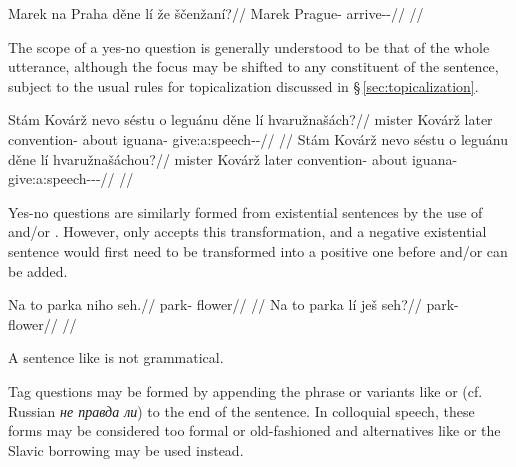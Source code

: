 \pex
\begingl
  \gla Marek na Praha děne lí že ščenžaní?//
  \glb Marek \Loc{} Prague-\Acc{} \Spec{} \Q{} \Pfv{} arrive-\Av{}-\Ret{}//
  \glft {}//
\endgl
\xe

The scope of a yes-no question is generally understood to be that of the whole
utterance, although the focus may be shifted to any constituent of the sentence,
subject to the usual rules for topicalization discussed in
\S\,\ref{sec:topicalization}.

\pex
\a\begingl
  \gla Stám Kovárž nevo séstu o leguánu děne lí hvaružnašách?//
  \glb mister Kovárž later convention-\Ins{} about iguana-\Ins{} \Spec{} \Q{} give:a:speech-\Av{}-\Ctp{}//
  \glft {}//
  \endgl
\a\begingl
  \gla Stám Kovárž nevo séstu o leguánu děne lí hvaružnašáchou?//
  \glb mister Kovárž later convention-\Ins{} about iguana-\Ins{} \Spec{} \Q{} give:a:speech-\Av{}-\Ctp{}-\Nz{}//
  \glft {}//
  \endgl
\xe

Yes-no questions are similarly formed from existential sentences by the use of
 and/or . However, only  accepts this transformation,
and a negative existential sentence would first need to be transformed into a
positive one before  and/or  can be added.

\pex
\a \begingl
  \gla Na to parka niho seh.//
  \glb \Loc{} \Dem{} park-\Acc{} \N{}\Exst{} flower//
  \glft {}//
  \endgl
\a \begingl
  \gla Na to parka lí ješ seh?//
  \glb \Loc{} \Dem{} park-\Acc{} \Q{} \Exst{} flower//
  \glft {}//
  \endgl
\xe

A sentence like  is not grammatical.

Tag questions may be formed by appending the phrase  or variants like  or 
(cf. Russian \textit{\cyrtext не правда ли}) to the end of the
sentence. In colloquial speech, these forms may be considered too formal or
old-fashioned and alternatives like  
 or the Slavic borrowing  may be used
instead.

